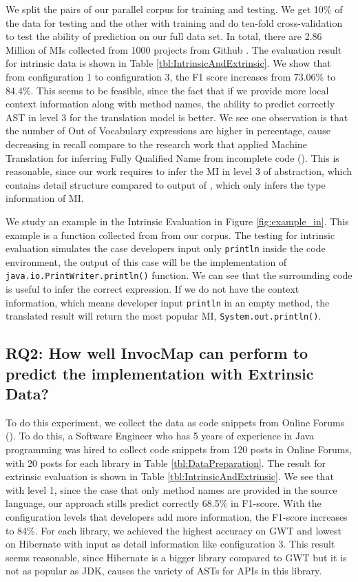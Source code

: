 We split the pairs of our parallel corpus for training and testing. We get 10\% of the data for testing and the other with training and do ten-fold cross-validation to test the ability of prediction on our full data set. In total, there are 2.86 Million of MIs collected from 1000 projects from Github \cite{id:Github}.
The evaluation result for intrinsic data is shown in Table \ref{tbl:IntrinsicAndExtrinsic}. We show that from configuration 1 to configuration 3, the F1 score increases from 73.06\% to 84.4\%. This seems to be feasible, since the fact that if we provide more local context information along with method names, the ability to predict correctly AST in level 3 for the translation model is better. We see one observation is that the number of Out of Vocabulary expressions are higher in percentage, cause decreasing in recall compare to the research work that applied Machine Translation for inferring Fully Qualified Name from incomplete code (\cite{8453132}). This is reasonable, since our work requires to infer the MI in level 3 of abstraction, which contains detail structure compared to output of \cite{8453132}, which only infers the type information of MI. 

We study an example in the Intrinsic Evaluation in Figure \ref{fig:example_in}. This example is a function collected from \cite{id:IntrinsicAndroidExample} from our corpus. The testing for intrinsic evaluation simulates the case developers input only \texttt{println} inside the code environment, the output of this case will be the implementation of \texttt{java.io.PrintWriter.println()} function. We can see that the surrounding code is useful to infer the correct expression. If we do not have the context information, which means developer input \texttt{println} in an empty method, the translated result will return the most popular MI, \texttt{System.out.println()}.

\subsection{RQ2: How well InvocMap can perform to predict the implementation with Extrinsic Data?}

To do this experiment, we collect the data as code snippets from Online Forums (\cite{id:StackOverflow,id:ProgramCreek,id:GeeksForGeeks}). To do this, a Software Engineer who has 5 years of experience in Java programming was hired to collect code snippets from 120 posts in Online Forums, with 20 posts for each library in Table \ref{tbl:DataPreparation}. The result for extrinsic evaluation is shown in Table \ref{tbl:IntrinsicAndExtrinsic}. We see that with level 1, since the case that only method names are provided in the source language, our approach stills predict correctly 68.5\% in F1-score. With the configuration levels that developers add more information, the F1-score increases to 84\%. For each library, we achieved the highest accuracy on GWT and lowest on Hibernate with input as detail information like configuration 3. This result seems reasonable, since Hibernate is a bigger library compared to GWT but it is not as popular as JDK, causes the variety of ASTs for APIs in this library.

